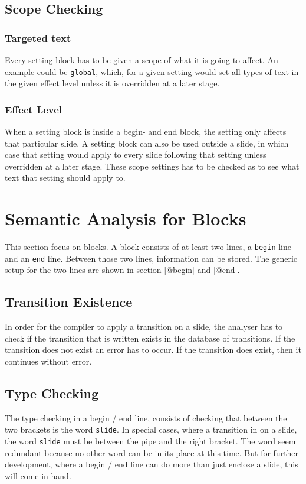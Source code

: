      
\subsection{Scope Checking}

\subsubsection*{Targeted text}
Every setting block has to be given a scope of what it is going to affect. An example could be \texttt{global}, which, for a given setting would set all types of text in the given effect level unless it is overridden at a later stage.
\subsubsection*{Effect Level}
When a setting block is inside a begin- and end block, the setting only affects that particular slide.
A setting block can also be used outside a slide, in which case that setting would apply to every slide following that setting unless overridden at a later stage. These scope settings has to be checked as to see what text that setting should apply to.

\section{Semantic Analysis for Blocks}
This section focus on blocks. A block consists of at least two lines, a \texttt{begin} line and an \texttt{end} line.
Between those two lines, information can be stored.
The generic setup for the two lines are shown in section \ref{@begin} and \ref{@end}.

    \subsection{Transition Existence}
In order for the compiler to apply a transition on a slide, the analyser has to check if the transition that is written exists in the database of transitions. If the transition does not exist an error has to occur. If the transition does exist, then it continues without error.

    \subsection{Type Checking}
The type checking in a begin / end line, consists of checking that between the two brackets is the word \texttt{slide}. In special cases, where a transition in on a slide, the word \texttt{slide} must be between the pipe and the right bracket. The word seem redundant because no other word can be in its place at this time. But for further development, where a begin / end line can do more than just enclose a slide, this will come in hand.


